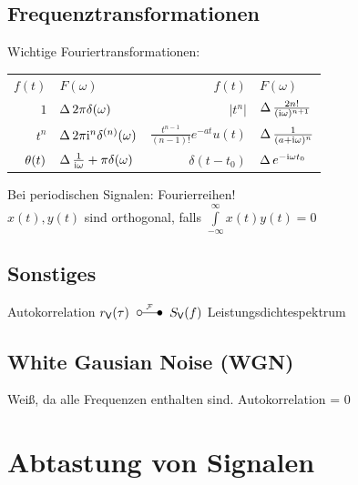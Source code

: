 \documentclass[fs, footer]{latex4ei}
\begin{document}
\begin{multicols*}{4}
	\subsection{Frequenztransformationen}
	Wichtige Fouriertransformationen:\\
	\begin{tabular}{rl|rl}
		$f(t)$ & \qquad $F(\omega)$ & $f(t)$ & \qquad $F(\omega)$\\		%
		$1$ & \!\!\!\!\!\!\!\!\!\! $\operatorname{\Delta} 2\pi \delta(\omega)$ & $|t^n|$ & \!\!\!\!\!\!\!\!\!\! $\operatorname{\Delta} \frac{2n!}{(\mathrm{i} \omega)^{n+1}}$\\
		$t^n$ & \!\!\!\!\!\!\!\!\!\! $\operatorname{\Delta} 2\pi \mathrm{i}^n \delta^{(n)}(\omega)$ & $\frac{t^{n-1}}{(n-1)!} e^{-at} u(t)$ & \!\!\!\!\!\!\!\!\!\! $\operatorname{\Delta} \frac{1}{(a+\mathrm{i} \omega)^n}$\\[0.5em]
		$\operatorname{\theta}(t)$ & \!\!\!\!\!\!\!\!\!\! $\operatorname{\Delta} \frac{1}{\mathrm{i} \omega} + \pi \delta(\omega)$ & $\delta(t-t_0)$ & \!\!\!\!\!\!\!\!\!\! $\operatorname{\Delta} e^{-\mathrm{i} \omega t_0}$
	\end{tabular}

	Bei periodischen Signalen: Fourierreihen!\\
	$x(t),y(t)$ sind orthogonal, falls $\int\limits_{-\infty}^\infty x(t)y(t) = 0$


	\subsection{Sonstiges}
	Autokorrelation $r_{\textsf{V}}(\tau) \FT S_{\textsf{V}}(f)$ Leistungsdichtespektrum
	
	
	\subsection{White Gausian Noise (WGN)}
	Weiß, da alle Frequenzen enthalten sind.
	Autokorrelation = 0
	


\section{Abtastung von Signalen}
\end{multicols*}
\end{document}
